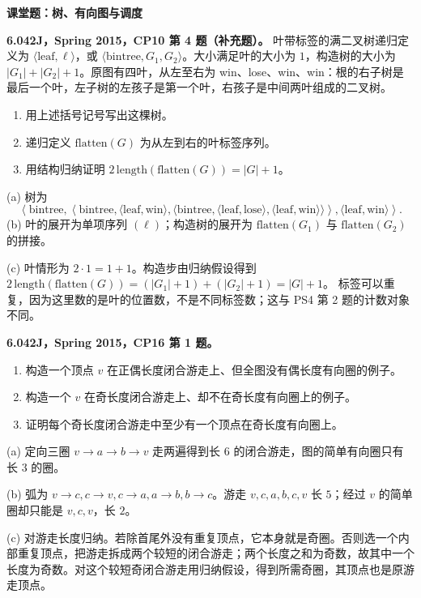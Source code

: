 \par\addvspace{7pt}\noindent\textbf{课堂题：树、有向图与调度}\par
\begin{exercise}\label{mit:6042-cp10-q4}
\textbf{6.042J，Spring 2015，CP10 第 4 题（补充题）。}
叶带标签的满二叉树递归定义为 $\langle\mathrm{leaf},\ell\rangle$，或 $\langle\mathrm{bintree},G_1,G_2\rangle$。大小满足叶的大小为 $1$，构造树的大小为 $|G_1|+|G_2|+1$。原图有四叶，从左至右为 win、lose、win、win：根的右子树是最后一个叶，左子树的左孩子是第一个叶，右孩子是中间两叶组成的二叉树。
\begin{enumerate}[label=(\alph*)]
\item 用上述括号记号写出这棵树。
\item 递归定义 $\mathrm{flatten}(G)$ 为从左到右的叶标签序列。
\item 用结构归纳证明 $2\,\mathrm{length}(\mathrm{flatten}(G))=|G|+1$。
\end{enumerate}
\end{exercise}
\begin{solution}
(a) 树为
\[
\left\langle\mathrm{bintree},
 \left\langle\mathrm{bintree},\langle\mathrm{leaf},\mathrm{win}\rangle,
  \langle\mathrm{bintree},\langle\mathrm{leaf},\mathrm{lose}\rangle,
  \langle\mathrm{leaf},\mathrm{win}\rangle\rangle\right\rangle,
 \langle\mathrm{leaf},\mathrm{win}\rangle\right\rangle.
\]
(b) 叶的展开为单项序列 $(\ell)$；构造树的展开为 $\mathrm{flatten}(G_1)$ 与 $\mathrm{flatten}(G_2)$ 的拼接。

(c) 叶情形为 $2\cdot1=1+1$。构造步由归纳假设得到
$2\,\mathrm{length}(\mathrm{flatten}(G))=(|G_1|+1)+(|G_2|+1)=|G|+1$。
标签可以重复，因为这里数的是叶的位置数，不是不同标签数；这与 PS4 第 2 题的计数对象不同。
\end{solution}

\begin{exercise}\label{mit:6042-cp16-q1}
\textbf{6.042J，Spring 2015，CP16 第 1 题。}
\begin{enumerate}[label=(\alph*)]
\item 构造一个顶点 $v$ 在正偶长度闭合游走上、但全图没有偶长度有向圈的例子。
\item 构造一个 $v$ 在奇长度闭合游走上、却不在奇长度有向圈上的例子。
\item 证明每个奇长度闭合游走中至少有一个顶点在奇长度有向圈上。
\end{enumerate}
\end{exercise}
\begin{solution}
(a) 定向三圈 $v\to a\to b\to v$ 走两遍得到长 $6$ 的闭合游走，图的简单有向圈只有长 $3$ 的圈。

(b) 弧为 $v\to c,c\to v,c\to a,a\to b,b\to c$。游走 $v,c,a,b,c,v$ 长 $5$；经过 $v$ 的简单圈却只能是 $v,c,v$，长 $2$。

(c) 对游走长度归纳。若除首尾外没有重复顶点，它本身就是奇圈。否则选一个内部重复顶点，把游走拆成两个较短的闭合游走；两个长度之和为奇数，故其中一个长度为奇数。对这个较短奇闭合游走用归纳假设，得到所需奇圈，其顶点也是原游走顶点。
\end{solution}

